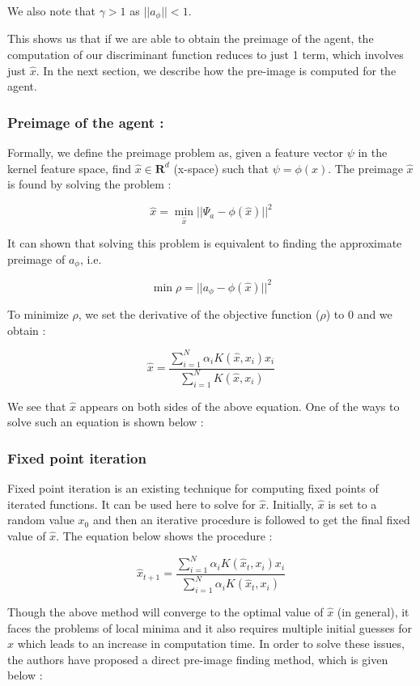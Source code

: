 \documentclass{article} %
\begin{document}
We also note that $\gamma >1$ as $||a_\phi|| < 1$.

This shows us that if we are able to obtain the preimage of the agent, the computation of our discriminant function reduces to just 1 term, which involves just $\hat{x}$. In the next section, we describe how the pre-image is computed for the agent.



\subsubsection{Preimage of the agent :}

Formally, we define the preimage problem as, given a feature vector $\psi$ in the kernel feature space, find $\hat{x} \in \mathbf{R}^d $ (x-space) such that $\psi = \phi(x)$.
The preimage $\hat{x}$ is found by solving the problem :

\[ \hat{x} = \min_{\hat{x}} ||\Psi_a - \phi(\hat{x}) ||^2   \]

It can shown that solving this problem is equivalent to finding the approximate preimage of $a_\phi$, i.e.

\[ \min \rho = ||a_\phi - \phi(\hat{x}) ||^2 \]


To minimize $\rho$, we set the derivative of the objective function ($\rho$) to 0 and we obtain : 

\[ \hat{x} = \frac{\sum\limits_{i=1}^N \alpha_i K(\hat{x},x_i)x_i}{\sum\limits_{i=1}^N K(\hat{x},x_i)} \]

We see that $\hat{x}$ appears on both sides of the above equation. One of the ways to solve such an equation is shown below :
\subsubsection*{Fixed point iteration}

Fixed point iteration is an existing technique for computing fixed points of iterated functions.
It can be used here to solve for $\hat{x}$. Initially, $\hat{x}$ is set to a random value $x_0$ and then an iterative procedure is followed to get the final fixed value of $\hat{x}$. The equation below shows the procedure :

\[ \hat{x}_{t+1} = \frac{\sum\limits_{i=1}^N  \alpha_i  K(\hat{x}_t,x_i) x_i}{\sum\limits_{i=1}^N  \alpha_i K(\hat{x}_t,x_i)} \]

Though the above method will converge to the optimal value of $\hat{x}$ (in general), it faces the problems of local minima and it also requires multiple initial guesses for $\hat{x}$ which leads to an increase in computation time. In order to solve these issues, the authors have proposed a direct pre-image finding method, which is given below :
\end{document}
